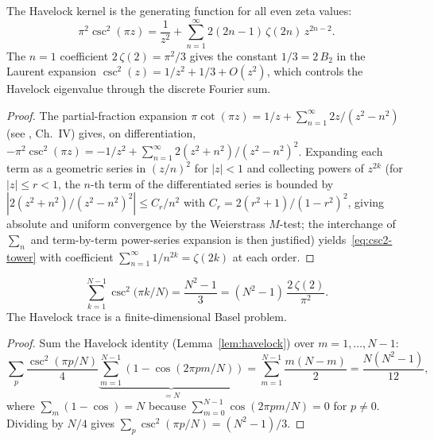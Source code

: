 \begin{theorem}
\label{thm:csc2-zeta-tower}
The Havelock kernel is the generating function for all
even zeta values:
\begin{equation}\label{eq:csc2-tower}
  \pi^2\csc^2(\pi z)
  = \frac{1}{z^2}
  + \sum_{n=1}^{\infty} 2(2n{-}1)\,\zeta(2n)\,z^{2n-2}.
\end{equation}
The $n = 1$ coefficient $2\,\zeta(2) = \pi^2/3$ gives the
constant $1/3 = 2\,B_2$ in the Laurent expansion
$\csc^2(z) = 1/z^2 + 1/3 + O(z^2)$, which controls the
Havelock eigenvalue through the discrete Fourier sum.
\end{theorem}
\begin{proof}
The partial-fraction expansion
$\pi\cot(\pi z) = 1/z + \sum_{n=1}^{\infty}
2z/(z^2{-}n^2)$
(see \citealt{Lang2002}, Ch.~IV)
gives, on differentiation,
$-\pi^2\csc^2(\pi z) = -1/z^2
+ \sum_{n=1}^{\infty} 2(z^2{+}n^2)/(z^2{-}n^2)^2$.
Expanding each term as a geometric series in $(z/n)^2$
for $|z| < 1$ and collecting powers of $z^{2k}$
(for $|z| \le r < 1$, the $n$-th term of the differentiated
series is bounded by $|2(z^2{+}n^2)/(z^2{-}n^2)^2|
\le C_r/n^2$ with $C_r = 2(r^2{+}1)/(1-r^2)^2$, giving
absolute and uniform convergence by the Weierstrass $M$-test;
the interchange of~$\sum_n$ and term-by-term power-series
expansion is then justified)
yields~\eqref{eq:csc2-tower} with coefficient
$\sum_{n=1}^{\infty} 1/n^{2k} = \zeta(2k)$
at each order.
\end{proof}

\begin{theorem}
\label{thm:finite-basel}
\begin{equation}\label{eq:finite-basel}
  \sum_{k=1}^{N-1}\csc^2\!\bigl(\pi k/N\bigr)
  = \frac{N^2{-}1}{3}
  = (N^2{-}1)\,\frac{2\,\zeta(2)}{\pi^2}.
\end{equation}
The Havelock trace is a finite-dimensional Basel problem.
\end{theorem}
\begin{proof}
Sum the Havelock identity
(Lemma~\ref{lem:havelock}) over $m = 1, \ldots, N{-}1$:
\[
  \textstyle
  \sum_p \frac{\csc^2(\pi p/N)}{4}
  \underbrace{\sum_{m=1}^{N-1}
  (1 - \cos(2\pi pm/N))}_{= N}
  = \sum_{m=1}^{N-1} \frac{m(N{-}m)}{2}
  = \frac{N(N^2{-}1)}{12},
\]
where $\sum_m(1 - \cos) = N$ because
$\sum_{m=0}^{N-1}\cos(2\pi pm/N) = 0$ for $p \ne 0$.
Dividing by $N/4$ gives
$\sum_p \csc^2(\pi p/N) = (N^2{-}1)/3$.
\end{proof}

